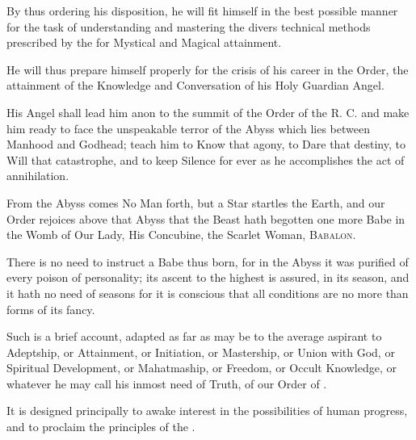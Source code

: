 By thus ordering his disposition, he will fit himself in the best possible manner for the task of understanding and mastering the divers technical methods prescribed by the \Argentium{} for Mystical and Magical attainment.

He will thus prepare himself properly for the crisis of his career in the Order, the attainment of the Knowledge and Conversation of his Holy Guardian Angel.

His Angel shall lead him anon to the summit of the Order of the R. C. and make him ready to face the unspeakable terror of the Abyss which lies between Manhood and Godhead; teach him to Know that agony, to Dare that destiny, to Will that catastrophe, and to keep Silence for ever as he accomplishes the act of annihilation.

From the Abyss comes No Man forth, but a Star startles the Earth, and our Order rejoices above that Abyss that the Beast hath begotten one more Babe in the Womb of Our Lady, His Concubine, the Scarlet Woman, \textsc{Babalon}.

There is no need to instruct a Babe thus born, for in the Abyss it was purified of every poison of personality; its ascent to the highest is assured, in its season, and it hath no need of seasons for it is conscious that all conditions are no more than forms of its fancy.

Such is a brief account, adapted as far as may be to the average aspirant to Adeptship, or Attainment, or Initiation, or Mastership, or Union with God, or Spiritual Development, or Mahatmaship, or Freedom, or Occult Knowledge, or whatever he may call his inmost need of Truth, of our Order of \Argentium{}.

It is designed principally to awake interest in the possibilities of human progress, and to proclaim the principles of the \Argentium{}.

